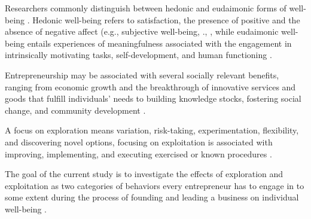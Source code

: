 \documentclass[man, 12pt, a4paper, noextraspace]{apa6}
\begin{document}
Researchers commonly distinguish between hedonic and eudaimonic forms of well-being \parencite[e.g.,][]{Ryan2001}. 
Hedonic well-being refers to satisfaction, the presence of positive and the absence of negative aﬀect (e.g., subjective well-being, \citeauthor{Diener.1984}., \citeyear{Diener.1984}, while eudaimonic well-being entails experiences of meaningfulness associated with the engagement in intrinsically motivating tasks, self-development, and human functioning \parencite[e.g.,][]{Ryan2001}. 

Entrepreneurship may be associated with several socially relevant benefits, ranging from economic growth and the breakthrough of innovative services and goods that fulfill individuals' needs to building knowledge stocks, fostering social change, and community development \parencite[e.g.,][]{Wiklund.2019, Zahra2016, Acs2013}. 

A focus on exploration means variation, risk-taking, experimentation, flexibility, and discovering novel options, focusing on exploitation is associated with improving, implementing, and executing exercised or known procedures \parencite{March.1991, Good.2013}.

The goal of the current study is to investigate the effects of exploration and exploitation as two categories of behaviors every entrepreneur has to engage in to some extent during the process of founding and leading a business on individual well-being \parencite{Siren.2012, Uotila2009, DuaneIreland2007, Rosing.2017}.







\end{document}
